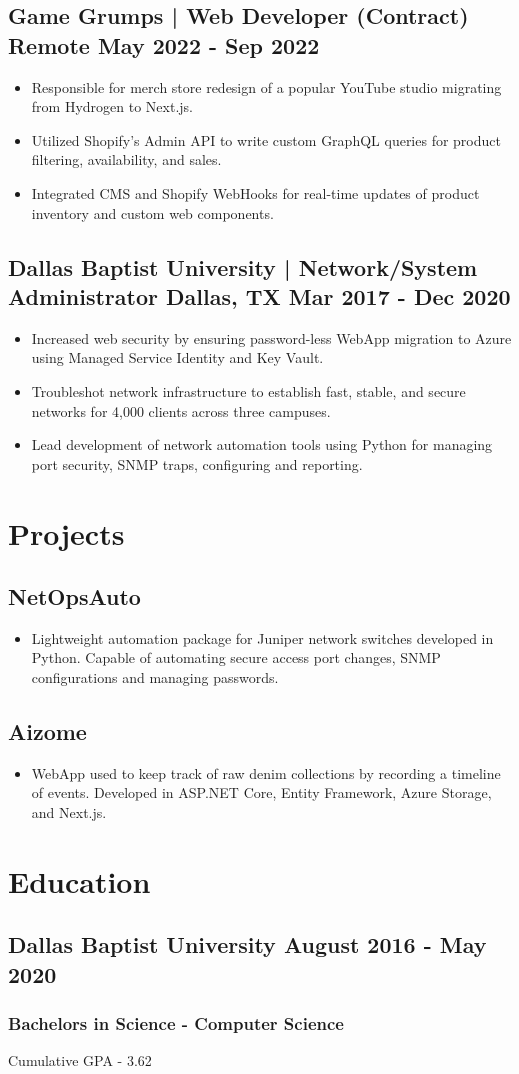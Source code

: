 \documentclass[letterpaper,10pt]{article}[leftmargin=*]
\def\mainsection#1{
  \section*{\Large{#1}}
}
\newcommand\worksection[4]{
	\subsection*{#1 \normalfont| \normalfont#2  {\normalsize\normalfont \hfill {\faMapMarker} \hspace{3pt}#3 \hspace{3pt} {\faCalendar} \hspace{5pt}#4}}
}
\begin{document}
  \worksection{Game Grumps}{Web Developer (Contract)}{Remote}{May 2022 - Sep 2022}
    
  \begin{itemize}
    \item{Responsible for merch store redesign of a popular YouTube studio migrating from Hydrogen to Next.js.}
    \item{Utilized Shopify's Admin API to write custom GraphQL queries for product filtering, availability, and sales.}
    \item{Integrated CMS and Shopify WebHooks for real-time updates of product inventory and custom web components.}
  \end{itemize}

  \worksection{Dallas Baptist University}{Network/System Administrator}{Dallas, TX}{Mar 2017 - Dec 2020}
    
  \begin{itemize}
    \item{Increased web security by ensuring password-less WebApp migration to Azure using Managed Service Identity and Key Vault.}
    \item{Troubleshot network infrastructure to establish fast, stable, and secure networks for 4,000 clients across three campuses.}
    \item{Lead development of network automation tools using Python for managing port security, SNMP traps, configuring and reporting.}
  \end{itemize}

  \mainsection{Projects}
  \subsection*{NetOpsAuto}
  \begin{itemize}
	  \item {Lightweight automation package for Juniper network switches developed in Python. Capable of automating secure access port changes, SNMP configurations and managing passwords.}
  \end{itemize}

  \subsection*{Aizome}
  \begin{itemize}
	  \item {WebApp used to keep track of raw denim collections by recording a timeline of events. Developed in ASP.NET Core, Entity Framework, Azure Storage, and Next.js.}
  \end{itemize}


  \mainsection{Education}
  \subsection*{Dallas Baptist University {\normalsize\normalfont\hfill {\faCalendar} \hspace{5pt}August 2016 - May 2020}}
  \subsubsection*{\normalfont Bachelors in Science - Computer Science } 
  Cumulative GPA - 3.62
\end{document}
